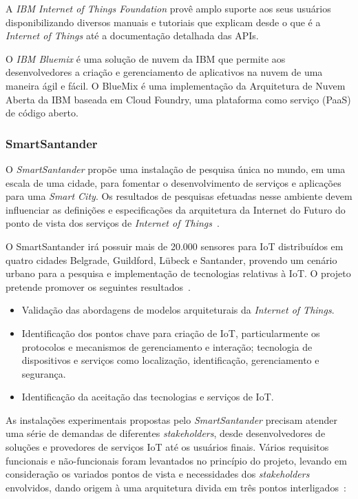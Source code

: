 A \textit{IBM Internet of Things Foundation} provê amplo suporte aos seus usuários
disponibilizando diversos manuais e tutoriais que explicam desde o que é a \textit{Internet of Things}
até a documentação detalhada das APIs.

O \textit{IBM Bluemix} é uma solução de nuvem da IBM que permite aos desenvolvedores a criação
e gerenciamento de aplicativos na nuvem de uma maneira ágil e fácil.
O BlueMix é uma implementação da Arquitetura de Nuvem Aberta da IBM baseada em Cloud Foundry, uma plataforma como serviço (PaaS) de código aberto.

\subsubsection{SmartSantander}
O \textit{SmartSantander} propõe uma instalação de pesquisa única no mundo, em uma escala de uma cidade,
para fomentar o desenvolvimento de serviços e aplicações para uma \textit{Smart City}.
Os resultados de pesquisas efetuadas nesse ambiente devem influenciar as definições e especificações da arquitetura da
Internet do Futuro do ponto de vista dos serviços de \textit{Internet of Things}~\cite{citeulike:13508566}.

O SmartSantander irá possuir mais de 20.000 sensores para IoT distribuídos em quatro cidades Belgrade,
Guildford, Lübeck e Santander, provendo um cenário urbano para a pesquisa e implementação de tecnologias relativas
à IoT.
O projeto pretende promover os seguintes resultados~\cite{smartsantandersite}.
\begin{itemize}
\item Validação das abordagens de modelos arquiteturais da \textit{Internet of Things}.
\item Identificação dos pontos chave para criação de IoT, particularmente os protocolos e mecanismos de gerenciamento e
interação; tecnologia de dispositivos e serviços como localização, identificação, gerenciamento e segurança.
\item Identificação da aceitação das tecnologias e serviços de IoT.
\end{itemize}

As instalações experimentais propostas pelo \textit{SmartSantander} precisam atender uma série de demandas
de diferentes \textit{stakeholders}, desde desenvolvedores de soluções e provedores de serviços IoT até os usuários finais.
Vários requisitos funcionais e não-funcionais foram levantados no princípio do projeto, levando em consideração
os variados pontos de vista e necessidades dos \textit{stakeholders} envolvidos, dando origem à uma arquitetura divida
em três pontos interligados~\cite{smartsantander_testbeds}:

